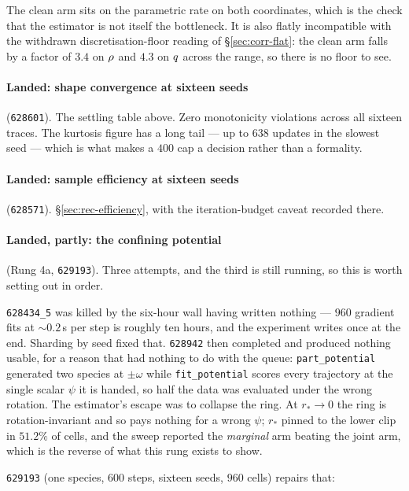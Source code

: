\noindent
The clean arm sits on the parametric rate on both coordinates, which is the check that the
estimator is not itself the bottleneck. It is also flatly incompatible with the withdrawn
discretisation-floor reading of \S\ref{sec:corr-flat}: the clean arm falls by a factor of $3.4$ on
$\rho$ and $4.3$ on $q$ across the range, so there is no floor to see.

\paragraph{Landed: shape convergence at sixteen seeds} (\texttt{628601}). The settling table above.
Zero monotonicity violations across all sixteen traces. The kurtosis figure has a long tail --- up
to $638$ updates in the slowest seed --- which is what makes a $400$ cap a decision rather than a
formality.

\paragraph{Landed: sample efficiency at sixteen seeds} (\texttt{628571}). \S\ref{sec:rec-efficiency},
with the iteration-budget caveat recorded there.

\paragraph{Landed, partly: the confining potential} (Rung 4a, \texttt{629193}).
\label{sec:rung4a-status}
Three attempts, and the third is still running, so this is worth setting out in order.

\texttt{628434\_5} was killed by the six-hour wall having written nothing --- $960$ gradient fits at
${\sim}0.2$\,s per step is roughly ten hours, and the experiment writes once at the end. Sharding by
seed fixed that. \texttt{628942} then completed and produced nothing usable, for a reason that had
nothing to do with the queue: \texttt{part\_potential} generated two species at $\pm\omega$ while
\texttt{fit\_potential} scores every trajectory at the single scalar $\psi$ it is handed, so half the
data was evaluated under the wrong rotation. The estimator's escape was to collapse the ring. At
$r_*\to0$ the ring is rotation-invariant and so pays nothing for a wrong $\psi$; $r_*$ pinned to the
lower clip in $51.2\%$ of cells, and the sweep reported the \emph{marginal} arm beating the joint
arm, which is the reverse of what this rung exists to show.

\texttt{629193} (one species, $600$ steps, sixteen seeds, $960$ cells) repairs that:


